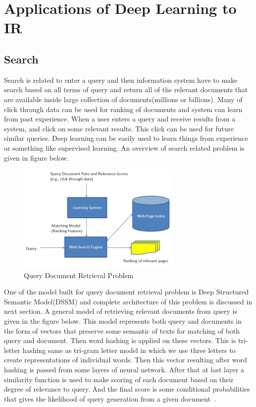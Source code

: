 \documentclass{doublecol-new}
\theoremstyle{TH}{
\newtheorem{lemma}{Lemma}
\newtheorem{theorem}[lemma]{Theorem}
\newtheorem{corrolary}[lemma]{Corrolary}
\newtheorem{conjecture}[lemma]{Conjecture}
\newtheorem{proposition}[lemma]{Proposition}
\newtheorem{claim}[lemma]{Claim}
\newtheorem{stheorem}[lemma]{Wrong Theorem}
\newtheorem{algorithm}{Algorithm}
}
\theoremstyle{THrm}{
\newtheorem{definition}{Definition}[section]
\newtheorem{question}{Question}[section]
\newtheorem{remark}{Remark}
\newtheorem{scheme}{Scheme}
}
\theoremstyle{THhit}{
\newtheorem{case}{Case}[section]
}
\begin{document}
\section{Applications of Deep Learning to IR}

\subsection{Search}
Search is related to enter a query and then information system have to make search based on all terms of query and return all of the relevant documents that are available inside large collection of documents(millions or billions). Many of click through data can be used for ranking of documents and system can learn from past experience. When a user enters a query and receive results from a system, and click on some relevant results. This click can be used for future similar queries. Deep learning can be easily used to learn things from experience or something like supervised learning. An overview of search related problem is given in figure below. 
\begin{figure}[h]
	\centerline{\includegraphics[width=8cm,keepaspectratio]{image/search.PNG}}
	\label{fig:Query Document Retrieval Problem}
	\caption{Query Document Retrieval Problem}
\end{figure} 
One of the model built for query document retrieval problem is Deep Structured Semantic Model(DSSM)  and complete architecture of this problem is discussed in next section. A general model of retrieving relevant documents from query is given in the figure below. This model represents both query and documents in the form of vectors that preserve some semantic of texts for matching of both query and document. Then word hashing is applied on these vectors. This is tri-letter hashing same as tri-gram letter model in which we use three letters to create representations of individual words. Then this vector resulting after word hashing is passed from some layers of neural network. After that at last layer a similarity function is used to make scoring of each document based on their degree of relevance to query. And the final score is some conditional probabilities that gives the likelihood of query generation from a given document~\cite{huang2013learning}.  
\end{document}
